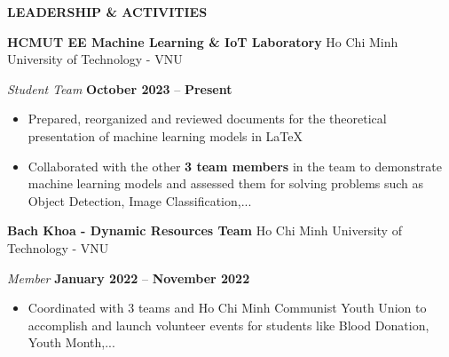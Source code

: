 \documentclass[a4paper,10pt]{article}
\begin{document}
\vspace{10pt}

\begin{center}
    \textbf{LEADERSHIP \& ACTIVITIES} \hrulefill
\end{center}

\textbf{HCMUT EE Machine Learning \& IoT Laboratory}	\hfill Ho Chi Minh University of Technology - VNU 

\textit{Student Team} \hfill \textbf{October 2023} – \textbf{Present}
\begin{itemize}[noitemsep, topsep=0pt, partopsep=0pt, parsep=0pt]
    \item Prepared, reorganized and reviewed documents for the theoretical presentation of machine learning models in \LaTeX
    \item Collaborated with the other \textbf{3 team members} in the team to demonstrate machine learning models and assessed them for solving problems such as Object Detection, Image Classification,...
\end{itemize}
\vspace{6pt}
\textbf{Bach Khoa - Dynamic Resources Team}	\hfill Ho Chi Minh University of Technology - VNU

\textit{Member} \hfill \textbf{January 2022} – \textbf{November 2022}
\begin{itemize}[noitemsep, topsep=0pt, partopsep=0pt, parsep=0pt]
    \item Coordinated with 3 teams and Ho Chi Minh Communist Youth Union to accomplish and launch volunteer events for students like Blood Donation, Youth Month,...
\end{itemize}
\end{document}
